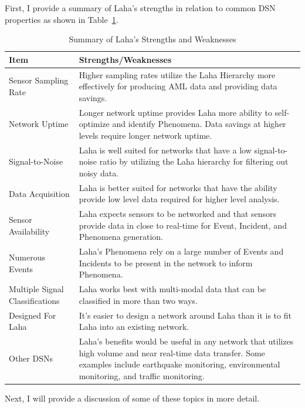 First, I provide a summary of Laha's strengths in relation to common DSN properties as shown in Table~\ref{table:summary_of_laha_viability}.

\begin{table}[h]
    \centering
    \caption{Summary of Laha's Strengths and Weaknesses}
    \begin{tabularx}{\textwidth}{lX}
        \toprule
        \textbf{Item} & \textbf{Strengths/Weaknesses} \\
        \midrule
        Sensor Sampling Rate & Higher sampling rates utilize the Laha Hierarchy more effectively for producing AML data and providing data savings. \\
        Network Uptime & Longer network uptime provides Laha more ability to self-optimize and identify Phenomena. Data savings at higher levels require longer network uptime. \\
        Signal-to-Noise & Laha is well suited for networks that have a low signal-to-noise ratio by utilizing the Laha hierarchy for filtering out noisy data. \\
        Data Acquisition & Laha is better suited for networks that have the ability provide low level data required for higher level analysis. \\
        Sensor Availability & Laha expects sensors to be networked and that sensors provide data in close to real-time for Event, Incident, and Phenomena generation. \\
        Numerous Events & Laha's Phenomena rely on a large number of Events and Incidents to be present in the network to inform Phenomena. \\
        Multiple Signal Classifications & Laha works best with multi-modal data that can be classified in more than two ways. \\
        Designed For Laha & It's easier to design a network around Laha than it is to fit Laha into an existing network. \\
        Other DSNs & Laha's benefits would be useful in any network that utilizes high volume and near real-time data transfer. Some examples include earthquake monitoring, environmental monitoring, and traffic monitoring. \\
        \bottomrule
    \end{tabularx}
    \label{table:summary_of_laha_viability}
\end{table}

Next, I will provide a discussion of some of these topics in more detail.

